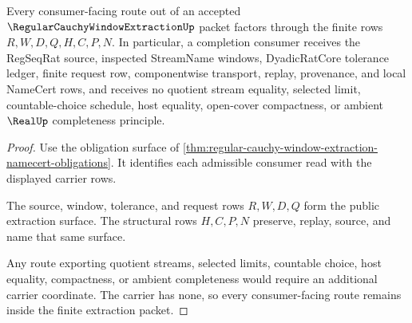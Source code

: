 \begin{theorem}
\label{thm:regular-cauchy-window-extraction-nonescape}
Every consumer-facing route out of an accepted $\RegularCauchyWindowExtractionUp$ packet factors through the finite rows $R,W,D,Q,H,C,P,N$. In particular, a completion consumer receives the RegSeqRat source, inspected StreamName windows, DyadicRatCore tolerance ledger, finite request row, componentwise transport, replay, provenance, and local NameCert rows, and receives no quotient stream equality, selected limit, countable-choice schedule, host equality, open-cover compactness, or ambient $\RealUp$ completeness principle.
\end{theorem}
\begin{proof}
Use the obligation surface of \autoref{thm:regular-cauchy-window-extraction-namecert-obligations}. It identifies each admissible consumer read with the displayed carrier rows.

The source, window, tolerance, and request rows $R,W,D,Q$ form the public extraction surface. The structural rows $H,C,P,N$ preserve, replay, source, and name that same surface.

Any route exporting quotient streams, selected limits, countable choice, host equality, compactness, or ambient completeness would require an additional carrier coordinate. The carrier has none, so every consumer-facing route remains inside the finite extraction packet.
\end{proof}




